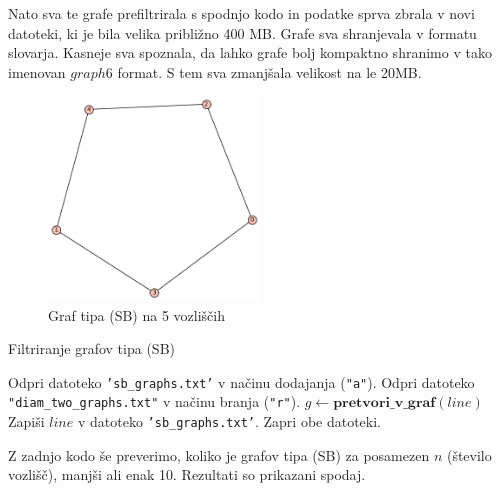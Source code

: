 \documentclass{article}
\begin{document}
Nato sva te grafe prefiltrirala s spodnjo kodo in podatke sprva zbrala v novi datoteki, ki je bila velika približno 400 MB. Grafe sva shranjevala v formatu slovarja. Kasneje sva spoznala, da lahko grafe bolj kompaktno shranimo v tako imenovan $graph6$ format. S tem sva zmanjšala velikost na le 20MB.


\begin{figure}[h!]
    \centering
    \includegraphics[width=0.5\textwidth]{sb_min_example1.png} %
    \caption{Graf tipa (SB) na 5 vozliščih}
    
\end{figure}


\begin{algorithm}
    \caption{Filtriranje grafov tipa (SB)}
    \begin{algorithmic}[1]
    \State Odpri datoteko \texttt{'sb\_graphs.txt'} v načinu dodajanja (\texttt{"a"}).
    \State Odpri datoteko \texttt{"diam\_two\_graphs.txt"} v načinu branja (\texttt{"r"}).
        \State $g \gets \textbf{pretvori\_v\_graf}(line)$ 
         
            \State Zapiši $line$ v datoteko \texttt{'sb\_graphs.txt'}.
        \EndIf
    \EndFor
    \State Zapri obe datoteki.
    \end{algorithmic}
\end{algorithm}

Z zadnjo kodo še preverimo, koliko je grafov tipa (SB) za posamezen $n$ (število vozlišč), manjši ali enak 10.
Rezultati so prikazani spodaj.
\end{document}
